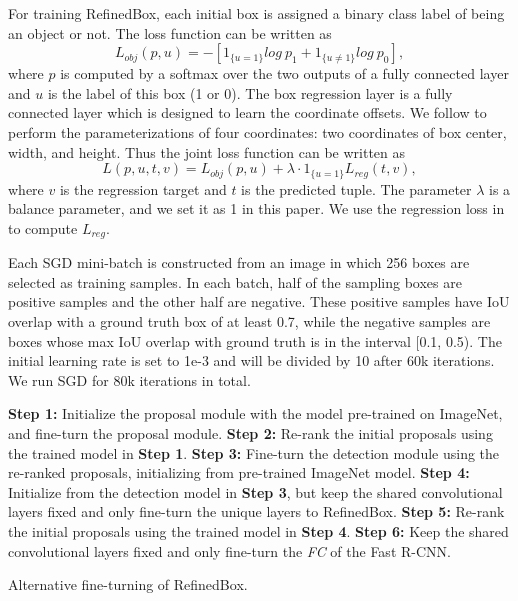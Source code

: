\documentclass[letterpaper]{article} %
\begin{document}
For training RefinedBox, each initial box is assigned a binary class label of being
an object or not.
The loss function can be written as
\begin{equation}
L_{obj}(p,u) = -[1_{\{u=1\}}log~p_1 + 1_{\{u \neq 1\}}log~p_0],
\end{equation}
where $p$ is computed by a softmax over the two outputs of a fully connected layer
and $u$ is the label of this box (1 or 0).
The box regression layer is a fully connected layer which is designed to learn
the coordinate offsets.
We follow \cite{girshick2014rich} to perform the parameterizations of four coordinates:
two coordinates of box center, width, and height.
Thus the joint loss function can be written as
\begin{equation}
L(p,u,t,v) = L_{obj}(p,u) + \lambda \cdot 1_{\{u=1\}} L_{reg}(t,v),
\end{equation}
where $v$ is the regression target and $t$ is the predicted tuple.
The parameter $\lambda$ is a balance parameter, and we set it as 1 in this paper.
We use the regression loss in \cite{girshick2015fast} to compute $L_{reg}$.


Each SGD mini-batch is constructed from an image in which 256 boxes are selected
as training samples.
In each batch, half of the sampling boxes are positive samples and the other half
are negative.
These positive samples have IoU overlap with a ground truth box of at least 0.7,
while the negative samples are boxes whose max IoU overlap with ground truth
is in the interval [0.1, 0.5).
The initial learning rate is set to 1e-3 and will be divided by 10 after
60k iterations.
We run SGD for 80k iterations in total.


\begin{algorithm}[tb]
\begin{algorithmic}
	\STATE \textbf{Step 1:} Initialize the proposal module with the model pre-trained
    	on ImageNet, and fine-turn the proposal module.
    \STATE \textbf{Step 2:} Re-rank the initial proposals using the trained model in
    	\textbf{Step 1}.
    \STATE \textbf{Step 3:} Fine-turn the detection module using the re-ranked proposals,
    	initializing from pre-trained ImageNet model.
    \STATE \textbf{Step 4:} Initialize from the detection model in \textbf{Step 3},
    	but keep the shared convolutional layers fixed and only fine-turn the unique
        layers to RefinedBox.
    \STATE \textbf{Step 5:} Re-rank the initial proposals using the trained model in
    	\textbf{Step 4}.
    \STATE \textbf{Step 6:} Keep the shared convolutional layers fixed and only
    	fine-turn the \textit{FC} of the Fast R-CNN.
\end{algorithmic}
\caption{Alternative fine-turning of RefinedBox.}
\label{alg:training}
\end{algorithm}
\end{document}
